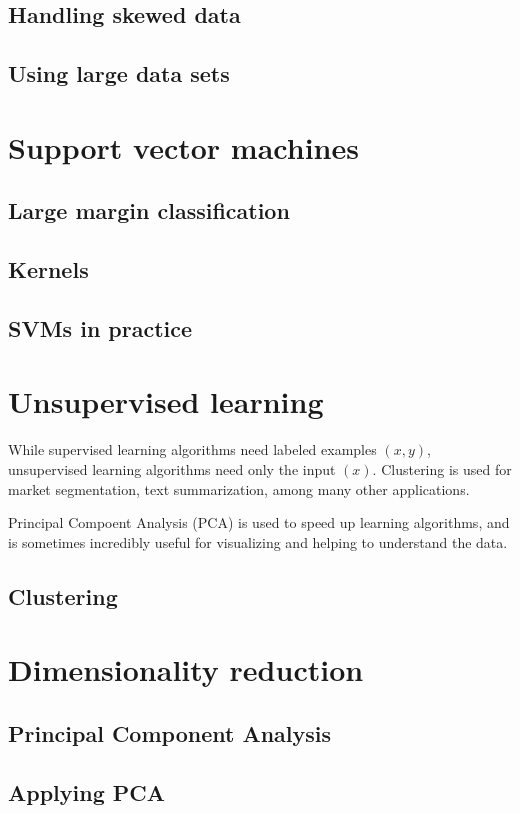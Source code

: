 	\subsection{Handling skewed data}
	\subsection{Using large data sets}

	\section{Support vector machines}
	\subsection{Large margin classification}
	\subsection{Kernels}
	\subsection{SVMs in practice}

	\section{Unsupervised learning}
	\noindent While supervised learning algorithms need labeled
	examples $ (x,y) $, unsupervised learning algorithms need only
	the input $ (x) $. Clustering is used for market segmentation,
	text summarization, among many other applications.

	\noindent Principal Compoent Analysis (PCA) is used to speed up
	learning algorithms, and is sometimes incredibly useful for
	visualizing and helping to understand the data.
	\subsection{Clustering}

	\section{Dimensionality reduction}
	\subsection{Principal Component Analysis}
	\subsection{Applying PCA}

